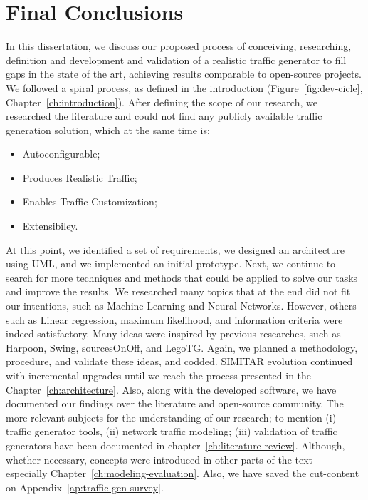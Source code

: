 \chapter{Final Conclusions}\label{ch:conclusion}



In this dissertation, we discuss our proposed process of conceiving, researching, definition and development and validation of a realistic traffic generator to fill gaps in the state of the art,  achieving results comparable to open-source projects.  We followed a spiral process, as defined in the introduction (Figure~\ref{fig:dev-cicle},  Chapter~\ref{ch:introduction}).  After defining the scope of our research, we researched the literature and could not find any publicly available traffic generation solution, which  at the same time is:

\begin{itemize}
\item Autoconfigurable;
\item Produces Realistic Traffic;
\item Enables Traffic Customization;
\item Extensibiley.
\end{itemize}

At this point, we identified a set of  requirements,  we designed an architecture using UML,  and we implemented  an initial prototype. Next, we continue to search for more techniques and methods that could be applied to solve our tasks and improve the results.  We researched many topics that at the end did not fit our intentions, such as Machine Learning and Neural Networks. However, others such as Linear regression, maximum likelihood, and information criteria were indeed satisfactory. Many ideas were inspired by previous researches, such as Harpoon, Swing, sourcesOnOff, and LegoTG.  Again, we planned a methodology, procedure, and validate these ideas, and codded.  SIMITAR evolution continued with incremental upgrades until we reach the process presented in the Chapter~\ref{ch:architecture}. Also, along with the developed software, we have documented our findings over the literature and open-source community. The more-relevant subjects for the understanding of our research; to mention (i) traffic generator tools, (ii) network traffic modeling; (iii) validation of traffic generators have been documented in chapter~\ref{ch:literature-review}. Although, whether necessary, concepts were introduced in other parts of the text -- especially Chapter~\ref{ch:modeling-evaluation}.  Also, we have saved the cut-content on Appendix~\ref{ap:traffic-gen-survey}. 

